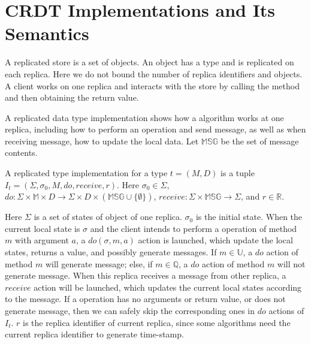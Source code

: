 
\section{CRDT Implementations and Its Semantics}
\label{sec:CRDT implementations and its semantics}

A replicated store is a set of objects. An object has a type and is replicated on each replica. Here we do not bound the number of replica identifiers and objects. A client works on one replica and interacts with the store by calling the method and then obtaining the return value.

A replicated data type implementation shows how a algorithm works at one replica, including how to perform an operation and send message, as well as when receiving message, how to update the local data. Let $\mathbb{MSG}$ be the set of message contents.

\begin{definition}
\label{definition:replicated type implementation}
A replicated type implementation for a type $t = (M,D)$ is a tuple $I_t = (\Sigma, \sigma_0, M, \mathit{do},\mathit{receive},r)$. Here $\sigma_0 \in \Sigma$, $\mathit{do}:\Sigma \times \mathbb{M} \times D \rightarrow \Sigma \times D \times (\mathbb{MSG} \cup \{ \emptyset \} )$, $\mathit{receive}: \Sigma \times \mathbb{MSG} \rightarrow \Sigma$, and $r \in \mathbb{R}$.
\end{definition}

Here $\Sigma$ is a set of states of object of one replica. $\sigma_0$ is the initial state. When the current local state is $\sigma$ and the client intends to perform a operation of method $m$ with argument $a$, a $\mathit{do}(\sigma,m,a)$ action is launched, which update the local states, returns a value, and possibly generate messages. If $m \in \mathbb{U}$, a $\mathit{do}$ action of method $m$ will generate message; else, if $m \in \mathbb{Q}$, a $\mathit{do}$ action of method $m$ will not generate message. When this replica receives a message from other replica, a $\mathit{receive}$ action will be launched, which updates the current local states according to the message. If a operation has no arguments or return value, or does not generate message, then we can safely skip the corresponding ones in $\mathit{do}$ actions of $I_t$. $r$ is the replica identifier of current replica, since some algorithms need the current replica identifier to generate time-stamp. 


